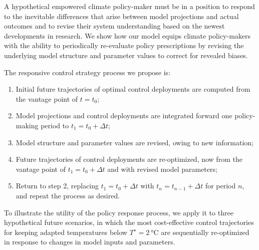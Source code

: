 \documentclass{article}
\begin{document}

A hypothetical empowered climate policy-maker must be in a position to respond to the inevitable differences that arise between model projections and actual outcomes and to revise their system understanding based on the newest developments in research. We show how our model equips climate policy-makers with the ability to periodically re-evaluate policy prescriptions by revising the underlying model structure and parameter values to correct for revealed biases.

The responsive control strategy process we propose is:
\begin{enumerate}
    \item Initial future trajectories of optimal control deployments are computed from the vantage point of $t=t_{0}$;
    \item Model projections and control deployments are integrated forward one policy-making period to $t_{1}=t_{0} + \Delta t$;
    \item Model structure and parameter values are revised, owing to new information;
    \item Future trajectories of control deployments are re-optimized, now from the vantage point of $t_{1}=t_{0}+\Delta t$ and with revised model parameters;
    \item Return to step 2, replacing $t_{1} = t_{0} + \Delta t$ with $t_{n} = t_{n-1}+\Delta t$ for period $n$, and repeat the process as desired.
\end{enumerate}

To illustrate the utility of the policy response process, we apply it to three hypothetical future scenarios, in which the most cost-effective control trajectories for keeping adapted temperatures below $T^{\star} = \SI{2}{\celsius}$ are sequentially re-optimized in response to changes in model inputs and parameters.
\end{document}
